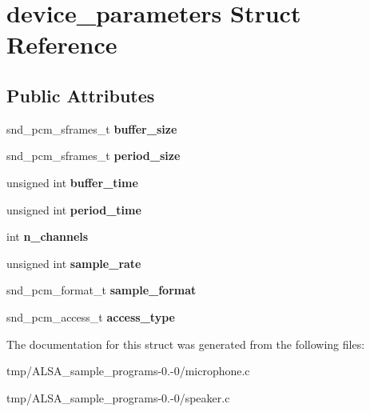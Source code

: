 \hypertarget{structdevice__parameters}{\section{device\-\_\-parameters \-Struct \-Reference}
\label{structdevice__parameters}
}
\subsection*{\-Public \-Attributes}
\begin{DoxyCompactItemize}
\item 
\hypertarget{structdevice__parameters_a1ccf3388681c2342639a699cd52156fe}{snd\-\_\-pcm\-\_\-sframes\-\_\-t {\bfseries buffer\-\_\-size}}\label{structdevice__parameters_a1ccf3388681c2342639a699cd52156fe}

\item 
\hypertarget{structdevice__parameters_afa66c48852bc08d4053cf7d4c10d75b0}{snd\-\_\-pcm\-\_\-sframes\-\_\-t {\bfseries period\-\_\-size}}\label{structdevice__parameters_afa66c48852bc08d4053cf7d4c10d75b0}

\item 
\hypertarget{structdevice__parameters_ab4089c99b18f223f476dd8279b980bbf}{unsigned int {\bfseries buffer\-\_\-time}}\label{structdevice__parameters_ab4089c99b18f223f476dd8279b980bbf}

\item 
\hypertarget{structdevice__parameters_a4061b17a2753745bf28914132a696fe1}{unsigned int {\bfseries period\-\_\-time}}\label{structdevice__parameters_a4061b17a2753745bf28914132a696fe1}

\item 
\hypertarget{structdevice__parameters_a2fcfcbe92721a94a37ebde0942520f17}{int {\bfseries n\-\_\-channels}}\label{structdevice__parameters_a2fcfcbe92721a94a37ebde0942520f17}

\item 
\hypertarget{structdevice__parameters_a16b799f7c7d79e5073b594afe6dc86c7}{unsigned int {\bfseries sample\-\_\-rate}}\label{structdevice__parameters_a16b799f7c7d79e5073b594afe6dc86c7}

\item 
\hypertarget{structdevice__parameters_a40fb4d0a8cea852d5c2b0e7dffeed941}{snd\-\_\-pcm\-\_\-format\-\_\-t {\bfseries sample\-\_\-format}}\label{structdevice__parameters_a40fb4d0a8cea852d5c2b0e7dffeed941}

\item 
\hypertarget{structdevice__parameters_ad2e1b8ca54ad1de97db7e84bb99a944b}{snd\-\_\-pcm\-\_\-access\-\_\-t {\bfseries access\-\_\-type}}\label{structdevice__parameters_ad2e1b8ca54ad1de97db7e84bb99a944b}

\end{DoxyCompactItemize}


\-The documentation for this struct was generated from the following files\-:\begin{DoxyCompactItemize}
\item 
tmp/\-A\-L\-S\-A\-\_\-sample\-\_\-programs-\/0.-\/0/microphone.\-c\item 
tmp/\-A\-L\-S\-A\-\_\-sample\-\_\-programs-\/0.-\/0/speaker.\-c\end{DoxyCompactItemize}
